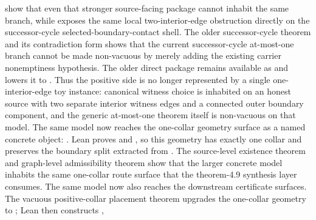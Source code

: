 \documentclass[11pt]{article}
\begin{document}
show that even that stronger source-facing package cannot inhabit the same
branch, while
exposes the same local two-interior-edge obstruction directly on the
successor-cycle selected-boundary-contact shell.  The older successor-cycle theorem
and its contradiction form
shows that the current successor-cycle at-most-one branch cannot be made
non-vacuous by merely adding the existing carrier nonemptiness hypothesis.
The older direct package remains available as
and lowers it to
.
Thus the positive side is no longer represented by a single one-interior-edge
toy instance: canonical witness choice is inhabited on an honest source with
two separate interior witness edges and a connected outer boundary component,
and the generic at-most-one theorem itself is non-vacuous on that model.
The same model now reaches the one-collar geometry surface as a named concrete
object:
.  Lean proves
 and
, so this geometry has
exactly one collar and preserves the boundary split extracted from
.  The source-level
existence theorem
and graph-level admissibility theorem
show that the larger concrete model inhabits the same one-collar route surface
that the theorem-4.9 synthesis layer consumes.
The same model now also reaches the downstream certificate surfaces.  The
vacuous positive-collar placement theorem
 upgrades the one-collar
geometry to
; Lean then
constructs
,
\end{document}
